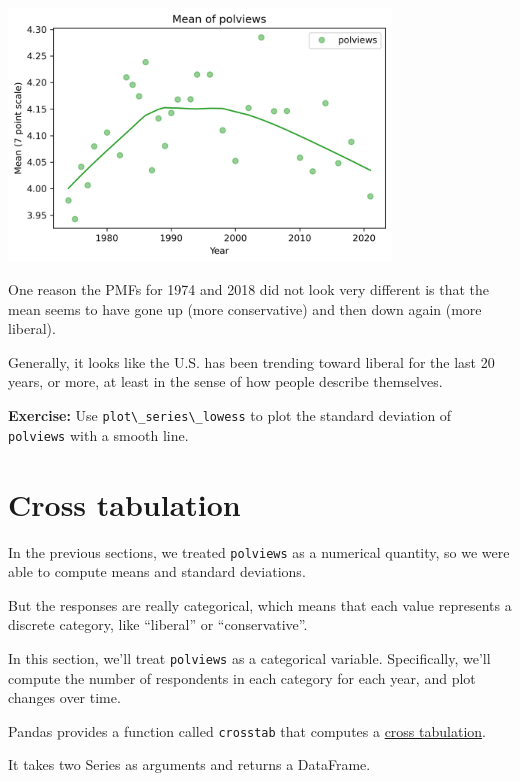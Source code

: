 \begin{center}
\includegraphics[width=4in]{chapters/02_polviews_files/02_polviews_53_0.png}
\end{center}

One reason the PMFs for 1974 and 2018 did not look very different is
that the mean seems to have gone up (more conservative) and then down
again (more liberal).

Generally, it looks like the U.S. has been trending toward liberal for
the last 20 years, or more, at least in the sense of how people describe
themselves.

\textbf{Exercise:} Use \passthrough{\lstinline!plot\_series\_lowess!} to
plot the standard deviation of \passthrough{\lstinline!polviews!} with a
smooth line.

\hypertarget{cross-tabulation}{%
\section{Cross tabulation}\label{cross-tabulation}}

In the previous sections, we treated \passthrough{\lstinline!polviews!}
as a numerical quantity, so we were able to compute means and standard
deviations.

But the responses are really categorical, which means that each value
represents a discrete category, like ``liberal'' or ``conservative''.

In this section, we'll treat \passthrough{\lstinline!polviews!} as a
categorical variable. Specifically, we'll compute the number of
respondents in each category for each year, and plot changes over time.

Pandas provides a function called \passthrough{\lstinline!crosstab!}
that computes a
\href{https://en.wikipedia.org/wiki/Contingency_table}{cross
tabulation}.

It takes two Series as arguments and returns a DataFrame.

